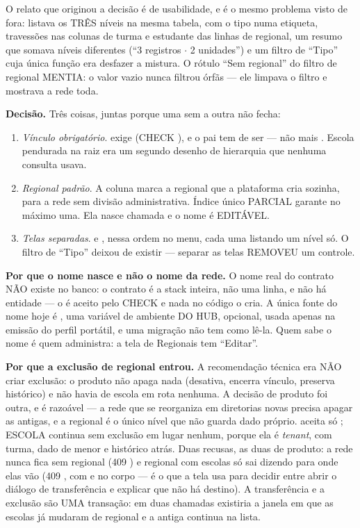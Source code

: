 O relato que originou a decisão é de usabilidade, e é o mesmo problema visto de
fora:  listava os TRÊS níveis na mesma tabela, com o tipo numa
etiqueta, travessões nas colunas de turma e estudante das linhas de regional, um
resumo que somava níveis diferentes (\enquote{3 registros $\cdot$ 2 unidades}) e
um filtro de \enquote{Tipo} cuja única função era desfazer a mistura. O rótulo
\enquote{Sem regional} do filtro de regional MENTIA: o valor vazio nunca filtrou
órfãs --- ele limpava o filtro e mostrava a rede toda.

\textbf{Decisão.} Três coisas, juntas porque uma sem a outra não fecha:

\begin{enumerate}
  \item \emph{Vínculo obrigatório}.  exige 
    (CHECK ), e o pai tem de ser
     --- não mais . Escola pendurada na raiz era um segundo
    desenho de hierarquia que nenhuma consulta usava.
  \item \emph{Regional padrão}. A coluna  marca a regional
    que a plataforma cria sozinha, para a rede sem divisão administrativa. Índice
    único PARCIAL garante no máximo uma. Ela nasce chamada  e o nome é
    EDITÁVEL.
  \item \emph{Telas separadas}.  e , nessa
    ordem no menu, cada uma listando um nível só. O filtro de \enquote{Tipo}
    deixou de existir --- separar as telas REMOVEU um controle.
\end{enumerate}

\textbf{Por que o nome nasce  e não o nome da rede.} O nome real do
contrato NÃO existe no banco: o contrato é a stack inteira, não uma linha, e não
há entidade  --- o  é aceito pelo CHECK e nada no
código o cria. A única fonte do nome hoje é , uma variável de
ambiente DO HUB, opcional, usada apenas na emissão do perfil portátil, e uma
migração não tem como lê-la. Quem sabe o nome é quem administra: a tela de
Regionais tem \enquote{Editar}.

\textbf{Por que a exclusão de regional entrou.} A recomendação técnica era NÃO
criar exclusão: o produto não apaga nada (desativa, encerra vínculo, preserva
histórico) e não havia  de escola em rota nenhuma. A decisão de
produto foi outra, e é razoável --- a rede que se reorganiza em diretorias novas
precisa apagar as antigas, e a regional é o único nível que não guarda dado
próprio.  aceita só ; ESCOLA
continua sem exclusão em lugar nenhum, porque ela é \emph{tenant}, com turma,
dado de menor e histórico atrás. Duas recusas, as duas de produto: a rede nunca
fica sem regional (409 ) e regional com escolas só sai dizendo
para onde elas vão (409 , com  e
 no corpo --- é o que a tela usa para decidir entre abrir o diálogo
de transferência e explicar que não há destino). A transferência e a exclusão são
UMA transação: em duas chamadas existiria a janela em que as escolas já mudaram
de regional e a antiga continua na lista.

